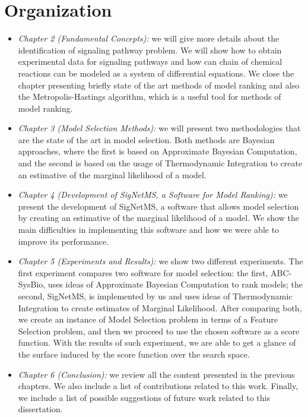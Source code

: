 \section{Organization}
\begin{itemize}
    \item{\em Chapter 2 (Fundamental Concepts):} we will give more 
        details about the identification of signaling pathway problem. 
        We will show how to obtain experimental data for signaling 
        pathways and how can chain of chemical reactions can be modeled 
        as a system  of differential equations. We close the chapter 
        presenting briefly state of the art methods of model ranking and
        also the  Metropolis-Hastings algorithm, which is a useful tool
        for methods of model ranking.
    \item{\em Chapter 3 (Model Selection Methods):} we will present two
        methodologies that are the state of the art in model selection.
        Both methods are Bayesian approaches, where the first is based
        on Approximate Bayesian Computation, and the second is based on
        the usage of Thermodynamic Integration to create an estimative
        of the marginal likelihood of a model.
    \item{\em Chapter 4 (Development of SigNetMS, a Software for Model
        Ranking):} we present the development of SigNetMS, a software
        that allows model selection by creating an estimative of the
        marginal likelihood of a model. We show the main difficulties
        in implementing this software and how we were able to improve
        its performance.
    \item{\em Chapter 5 (Experiments and Results):} we show two 
        different experiments. The first experiment compares two 
        software for model selection: the first, ABC-SysBio, uses ideas 
        of Approximate Bayesian Computation to rank models; the second,
        SigNetMS, is implemented by us and uses ideas of Thermodynamic
        Integration to create estimates of Marginal Likelihood. After
        comparing both, we create an instance of Model Selection problem
        in terms of a Feature Selection problem, and then we proceed to
        use the chosen software as a score function. With the results of
        such experiment, we are able to get a glance of the surface
        induced by the score function over the search space.
    \item{\em Chapter 6 (Conclusion):} we review all the content
        presented in the previous chapters. We also include a list of 
        contributions related to this work. Finally, we include a list
        of possible suggestions of future work related to this
        dissertation.
\end{itemize}
